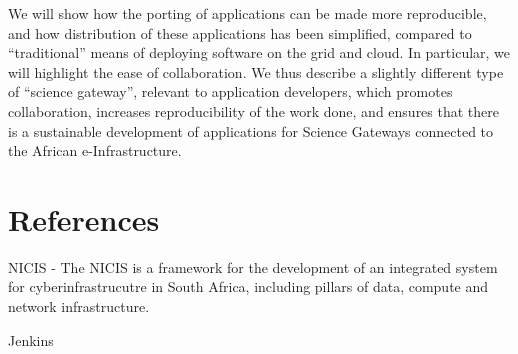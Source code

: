 \documentclass[oneside, a4paper, onecolumn, 11pt]{article}
\begin{document}
We will show how the porting of applications can be made more reproducible, and how distribution of these applications has been simplified, compared to “traditional” means of deploying software on the grid and cloud. In particular, we will highlight the ease of collaboration. We thus describe a slightly different type of “science gateway”, relevant to application developers, which promotes collaboration, increases reproducibility of the work done, and ensures that there is a sustainable development of applications for Science Gateways connected to the African e-Infrastructure.

\vfill


\section{References}

NICIS - The NICIS is a framework for the development of an integrated system for cyberinfrastrucutre in South Africa, including pillars of data, compute and network infrastructure. 

Jenkins




\begin{small}

\end{small}
\end{document}
